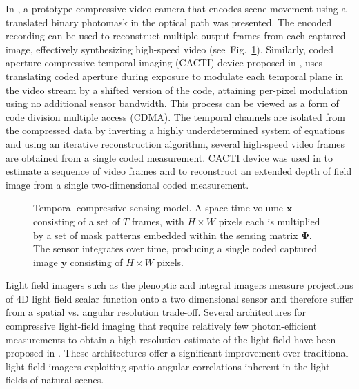 \documentclass[journal]{IEEEtran}
\begin{document}
In \cite{Koller2015}, a prototype compressive video camera that encodes scene movement using a translated binary photomask in the optical path was presented. The encoded recording can be used to reconstruct multiple output frames from each captured image, effectively synthesizing high-speed video (see~Fig.~\ref{fig:temporal_cs}). Similarly, coded aperture compressive temporal imaging (CACTI) device proposed in \cite{Llull2013}, uses translating coded aperture during exposure to modulate each temporal plane in the video stream by a shifted version of the code, attaining per-pixel modulation using no additional sensor bandwidth. This process can be viewed as a form of code division multiple access (CDMA). The temporal channels are isolated from the compressed data by inverting a highly underdetermined system of equations and using an iterative reconstruction algorithm, several high-speed video frames are obtained from a single coded measurement. CACTI device was used in \cite{Llull2014} to estimate a sequence of video frames and to reconstruct an extended depth of field image from a single two-dimensional coded measurement.
%
\begin{figure}
	\centering
	
	\caption{Temporal compressive sensing model. A space-time volume $\boldsymbol{x}$ consisting of a set of $T$ frames, with $H\times W$ pixels each is multiplied by a set of mask patterns embedded within the sensing matrix $\boldsymbol{\Phi}$. The sensor integrates over time, producing a single coded captured image $\boldsymbol{y}$ consisting of $H\times W$ pixels. \cite{Koller2015}}
	
	\label{fig:temporal_cs}
\end{figure}


Light field imagers such as the plenoptic and integral imagers measure projections of 4D light field scalar function onto a two dimensional sensor and therefore suffer from a spatial vs. angular resolution trade-off. Several architectures for compressive light-field imaging that require relatively few photon-efficient measurements to obtain a high-resolution estimate of the light field have been proposed in \cite{Ashok2010, Babacan2012, Marwah2013}. These architectures offer a significant improvement over traditional light-field imagers exploiting spatio-angular correlations inherent in the light fields of natural scenes. 
\end{document}
